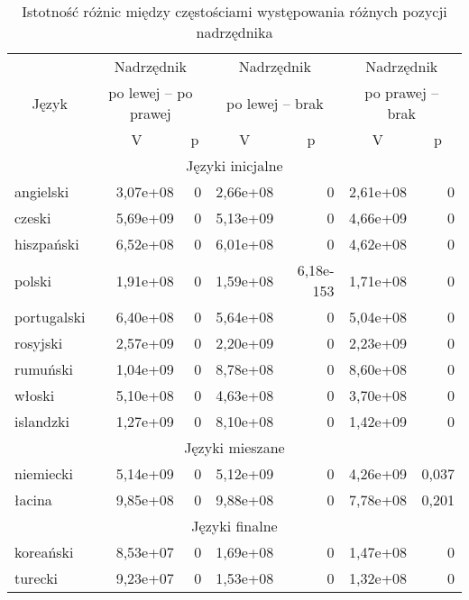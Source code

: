 \begin{table}[h!]
\centering
\begin{tabular}{lrrrrrr}
  \toprule
		& \multicolumn{2}{c}{Nadrzędnik} & \multicolumn{2}{c}{Nadrzędnik} & \multicolumn{2}{c}{Nadrzędnik}	\\
\multicolumn{1}{c}{Język} & \multicolumn{2}{c}{po lewej -- po prawej} & \multicolumn{2}{c}{po lewej -- brak} & \multicolumn{2}{c}{po prawej -- brak} \\
		& \multicolumn{1}{c}{V} & \multicolumn{1}{c}{p} & \multicolumn{1}{c}{V} & \multicolumn{1}{c}{p} & \multicolumn{1}{c}{V} & \multicolumn{1}{c}{p} \\
\midrule
\multicolumn{7}{c}{Języki inicjalne} \\
\midrule
angielski	& 3,07e+08 & 0 & 2,66e+08 & 0 & 2,61e+08 & 0 \\ 
czeski		& 5,69e+09 & 0 & 5,13e+09 & 0 & 4,66e+09 & 0 \\ 
hiszpański	& 6,52e+08 & 0 & 6,01e+08 & 0 & 4,62e+08 & 0 \\  
polski		& 1,91e+08 & 0 & 1,59e+08 & 6,18e-153 & 1,71e+08 & 0 \\ 
portugalski	& 6,40e+08 & 0 & 5,64e+08 & 0 & 5,04e+08 & 0 \\ 
rosyjski		& 2,57e+09 & 0 & 2,20e+09 & 0 & 2,23e+09 & 0 \\ 
rumuński		& 1,04e+09 & 0 & 8,78e+08 & 0 & 8,60e+08 & 0 \\ 
włoski		& 5,10e+08 & 0 & 4,63e+08 & 0 & 3,70e+08 & 0 \\
\hdashline
islandzki	& 1,27e+09 & 0 & 8,10e+08 & 0 & 1,42e+09 & 0 \\ 
\midrule
\multicolumn{7}{c}{Języki mieszane} \\
\midrule
niemiecki	& 5,14e+09 & 0 & 5,12e+09 & 0 & 4,26e+09 & 0,037 \\ 
łacina		& 9,85e+08 & 0 & 9,88e+08 & 0 & 7,78e+08 & 0,201 \\ 
\midrule
\multicolumn{7}{c}{Języki finalne} \\
\midrule
koreański	& 8,53e+07 & 0 & 1,69e+08 & 0 & 1,47e+08 & 0 \\ 
turecki		& 9,23e+07 & 0 & 1,53e+08 & 0 & 1,32e+08 & 0 \\ 
   \bottomrule
\end{tabular}
\label{tab:stat}
\caption{Istotność różnic między częstościami występowania różnych pozycji nadrzędnika}
\end{table}